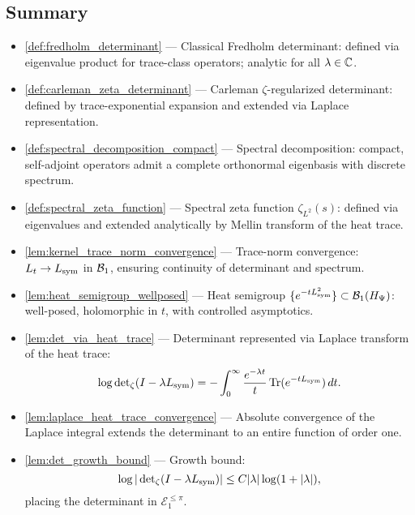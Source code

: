 \subsection*{Summary}

\begin{itemize}
  \item \cref{def:fredholm_determinant} — Classical Fredholm determinant: defined via eigenvalue product for trace-class operators; analytic for all \( \lambda \in \mathbb{C} \).

  \item \cref{def:carleman_zeta_determinant} — Carleman \(\zeta\)-regularized determinant: defined by trace-exponential expansion and extended via Laplace representation.

  \item \cref{def:spectral_decomposition_compact} — Spectral decomposition: compact, self-adjoint operators admit a complete orthonormal eigenbasis with discrete spectrum.

  \item \cref{def:spectral_zeta_function} — Spectral zeta function \( \zeta_{L^2}(s) \): defined via eigenvalues and extended analytically by Mellin transform of the heat trace.

  \item \cref{lem:kernel_trace_norm_convergence} — Trace-norm convergence: \( L_t \to L_{\mathrm{sym}} \) in \( \mathcal{B}_1 \), ensuring continuity of determinant and spectrum.

  \item \cref{lem:heat_semigroup_wellposed} — Heat semigroup \( \{e^{-tL_{\mathrm{sym}}^2}\} \subset \mathcal{B}_1(H_{\Psi}) \): well-posed, holomorphic in \( t \), with controlled asymptotics.

  \item \cref{lem:det_via_heat_trace} — Determinant represented via Laplace transform of the heat trace:
  \[
  \log \det\nolimits_\zeta(I - \lambda L_{\mathrm{sym}}) = - \int_0^\infty \frac{e^{-\lambda t}}{t} \operatorname{Tr}(e^{-t L_{\mathrm{sym}}}) \, dt.
  \]

  \item \cref{lem:laplace_heat_trace_convergence} — Absolute convergence of the Laplace integral extends the determinant to an entire function of order one.

  \item \cref{lem:det_growth_bound} — Growth bound:
  \[
  \log |\det\nolimits_\zeta(I - \lambda L_{\mathrm{sym}})| \le C |\lambda| \log(1 + |\lambda|),
  \]
  placing the determinant in \( \mathcal{E}_1^{\leq \pi} \).


\end{itemize}
